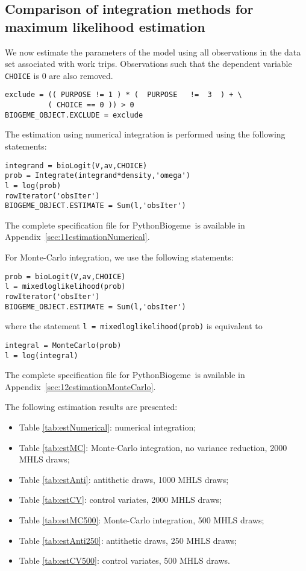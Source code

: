 \documentclass[12pt,a4paper]{article}
\newcommand{\PBIOGEME}{PythonBiogeme}
\begin{document}
\subsection{Comparison of integration methods for maximum likelihood estimation}

We now estimate the parameters of the model using all observations
in the data set associated with work trips. Observations such that the dependent variable \lstinline$CHOICE$ is $0$ are also removed.
\begin{lstlisting}
exclude = (( PURPOSE != 1 ) * (  PURPOSE   !=  3  ) + \
          ( CHOICE == 0 )) > 0
BIOGEME_OBJECT.EXCLUDE = exclude
\end{lstlisting}
The estimation using numerical integration is performed using the following statements:
\begin{lstlisting}
integrand = bioLogit(V,av,CHOICE)
prob = Integrate(integrand*density,'omega')
l = log(prob)
rowIterator('obsIter') 
BIOGEME_OBJECT.ESTIMATE = Sum(l,'obsIter')
\end{lstlisting}
The complete specification file for \PBIOGEME\ is available in
Appendix~\ref{sec:11estimationNumerical}.

For Monte-Carlo integration, we use the following statements:
\begin{lstlisting}
prob = bioLogit(V,av,CHOICE)
l = mixedloglikelihood(prob)
rowIterator('obsIter') 
BIOGEME_OBJECT.ESTIMATE = Sum(l,'obsIter')
\end{lstlisting}
where the statement \lstinline$l = mixedloglikelihood(prob)$ is
 equivalent to
\begin{lstlisting}
integral = MonteCarlo(prob)
l = log(integral)
\end{lstlisting}
The complete specification file for \PBIOGEME\ is available in
Appendix~\ref{sec:12estimationMonteCarlo}.

The following estimation results are presented:
\begin{itemize}
\item Table \ref{tab:estNumerical}: numerical integration;
\item Table \ref{tab:estMC}:  Monte-Carlo integration,
  no variance reduction, 2000 MHLS draws;
\item Table \ref{tab:estAnti}: antithetic  draws, 1000 MHLS draws;
\item Table \ref{tab:estCV}:  control variates, 2000 MHLS draws;
\item Table \ref{tab:estMC500}:  Monte-Carlo integration, 500 MHLS draws;
\item Table \ref{tab:estAnti250}:  antithetic   draws, 250 MHLS draws;
\item Table \ref{tab:estCV500}: control variates, 500 MHLS draws.
\end{itemize}
\end{document}
